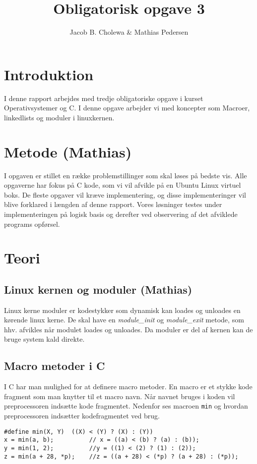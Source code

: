 \documentclass[danish]{report}
\title{Obligatorisk opgave 3}
\author{Jacob B. Cholewa \& Mathias Pedersen }
\begin{document}
\maketitle
\begingroup
\let\clearpage\relax
\chapter{Introduktion}
I denne rapport arbejdes med tredje obligatoriske opgave i kurset Operativsystemer og C. I denne opgave arbejder vi med koncepter som Macroer, linkedlists og moduler i linuxkernen.

\vspace{20 mm}\chapter{Metode (Mathias)}
I opgaven er stillet en række problemstillinger som skal løses på bedste vis. Alle opgaverne har fokus på C kode, som vi vil afvikle på en Ubuntu Linux virtuel boks. De fleste opgaver vil kræve implementering, og disse implementeringer vil blive forklared i længden af denne rapport. Vores løsninger testes under implementeringen på logisk basis og derefter ved observering af det afviklede programs opførsel.
\endgroup
\chapter{Teori}
\section{Linux kernen og moduler (Mathias)}

Linux kerne moduler er kodestykker som dynamisk kan loades og unloades en kørende linux kerne. De skal have en \textit{module\_init} og \textit{module\_exit} metode, som hhv. afvikles når modulet loades og unloades. Da moduler er del af kernen kan de bruge system kald direkte.

\section{Macro metoder i C}

I C har man mulighed for at definere macro metoder. En macro er et stykke kode fragment som man knytter til et macro navn. Når navnet bruges i koden vil preprocessoren indsætte kode fragmentet. Nedenfor ses macroen \texttt{min} og hvordan preprocessoren indsætter kodefragmentet ved brug.
\begin{lstlisting}
#define min(X, Y)  ((X) < (Y) ? (X) : (Y))
x = min(a, b);          // x = ((a) < (b) ? (a) : (b));
y = min(1, 2);          //y = ((1) < (2) ? (1) : (2));
z = min(a + 28, *p);    //z = ((a + 28) < (*p) ? (a + 28) : (*p));
\end{lstlisting}
\end{document}
